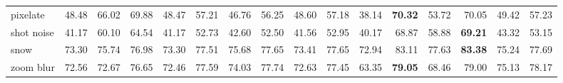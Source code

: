 \documentclass[11pt]{article}
\newcommand{\best}[1]{\textbf{\textcolor{BestBlue}{#1}}}
\begin{document}
{{\begin{tabular}{lrrrrrrrrrrrrrrr}
pixelate & 48.48 & 66.02 & 69.88 & 48.47 & 57.21 & 46.76 & 56.25 & 48.60 & 57.18 & 38.14 & \best{70.32} & 53.72 & 70.05 & 49.42 & 57.23 \\
shot noise & 41.17 & 60.10 & 64.54 & 41.17 & 52.73 & 42.60 & 52.50 & 41.56 & 52.95 & 40.17 & 68.87 & 58.88 & \best{69.21} & 43.32 & 53.15 \\
snow & 73.30 & 75.74 & 76.98 & 73.30 & 77.51 & 75.68 & 77.65 & 73.41 & 77.65 & 72.94 & 83.11 & 77.63 & \best{83.38} & 75.24 & 77.69 \\
zoom blur & 72.56 & 72.67 & 76.65 & 72.46 & 77.59 & 74.03 & 77.74 & 72.63 & 77.45 & 63.35 & \best{79.05} & 68.46 & 79.00 & 75.13 & 78.17 \\
\bottomrule
\end{tabular}
}
}
\end{document}
